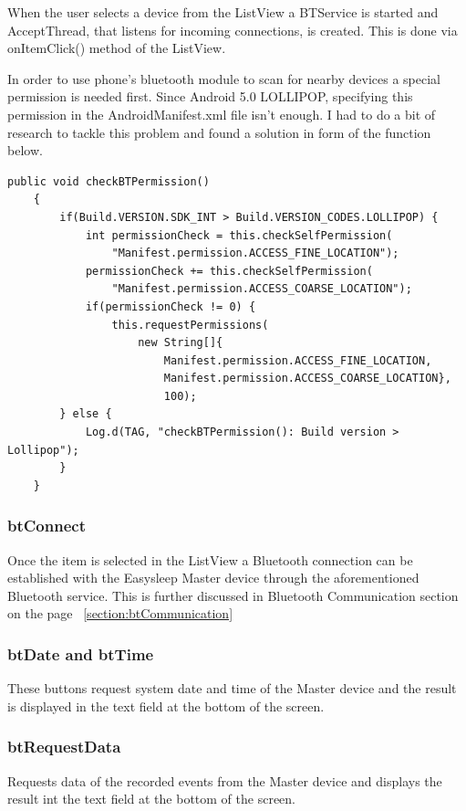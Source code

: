 \documentclass[12pt,a4paper]{article}
\begin{document}
    When the user selects a device from the ListView a BTService is started and AcceptThread, that listens for incoming connections, is created. This is done via onItemClick() method of the ListView.
    
    In order to use phone's bluetooth module to scan for nearby devices a special permission is needed first. Since Android 5.0 LOLLIPOP, specifying this permission in the AndroidManifest.xml file isn't enough. I had to do a bit of research to tackle this problem and found a solution in form of the function below.
    \begin{lstlisting}[label={lst:checkBTpermissions}, caption=checkBTpermissions()]
    public void checkBTPermission() 
    {
        if(Build.VERSION.SDK_INT > Build.VERSION_CODES.LOLLIPOP) {
            int permissionCheck = this.checkSelfPermission(
                "Manifest.permission.ACCESS_FINE_LOCATION");
            permissionCheck += this.checkSelfPermission(
                "Manifest.permission.ACCESS_COARSE_LOCATION");
            if(permissionCheck != 0) {
                this.requestPermissions(
                    new String[]{
                        Manifest.permission.ACCESS_FINE_LOCATION,
                        Manifest.permission.ACCESS_COARSE_LOCATION}, 
                        100);
        } else {
            Log.d(TAG, "checkBTPermission(): Build version > Lollipop");
        }
    }
    \end{lstlisting}
    
    \subsubsection*{btConnect}
    Once the item is selected in the ListView a Bluetooth connection can be established with the Easysleep Master device through the aforementioned Bluetooth service. This is further discussed in Bluetooth Communication section on the page ~\ref{section:btCommunication}
    
    \subsubsection*{btDate and btTime}
    These buttons request system date and time of the Master device and the result is displayed in the text field at the bottom of the screen.
    
    \subsubsection*{btRequestData}
    Requests data of the recorded events from the Master device and displays the result int the text field at the bottom of the screen.
    
\end{document}
